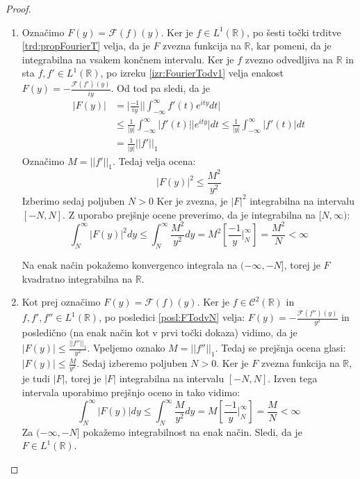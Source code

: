 \documentclass[a4paper, 10pt]{article}
\newcommand{\abs}[1]{\ensuremath{\lvert #1 \rvert}}
\newcommand{\mth}[1]{\ensuremath{\mathbb{#1}}}
\newcommand{\R}{\mth{R}}
\begin{document}
			\begin{proof}
				\begin{enumerate}
					\item Označimo $F(y) = \mathcal{F}(f)(y)$. Ker je $f\in L^1(\R)$, po šesti točki trditve \ref{trd:propFourierT} velja, da je $F$ zvezna funkcija na $\R$, kar pomeni, da je integrabilna na vsakem končnem intervalu. Ker je $f$ zvezno odvedljiva na $\R$ in sta $f, f'\in L^1(\R)$, po izreku \ref{izr:FourierTodv1} velja enakost $F(y) = -\frac{\mathcal{F}(f')(y)}{iy}$. Od tod pa sledi, da je \begin{align*}
						\abs{F(y)} &= \abs{\frac{-1}{iy}}\abs{\int_{-\infty}^{\infty}f'(t)e^{ity}dt} \\
						&\leq \frac{1}{\abs{y}}\int_{-\infty}^{\infty}\abs{f'(t)}\abs{e^{ity}}dt \leq \frac{1}{\abs{y}}\int_{-\infty}^{\infty}\abs{f'(t)}dt \\
						&= \frac{1}{\abs{y}}\abs{\abs{f'}}_1
					\end{align*} Označimo $M = \abs{\abs{f'}}_1$. Tedaj velja ocena: $$\abs{F(y)}^2 \leq \frac{M^2}{y^2} $$ 
					Izberimo sedaj poljuben $N> 0$ Ker je zvezna, je $\abs{F}^2$ integrabilna na intervalu $[-N, N]$. Z uporabo prejšnje ocene preverimo, da je integrabilna na $[N, \infty)$: $$\int_{N}^{\infty}\abs{F(y)}^2 dy \leq \int_{N}^{\infty}\frac{M^2}{y^2}dy = M^2 [\frac{-1}{y}|_{N}^{\infty}] = \frac{M^2}{N} < \infty$$
					
					Na enak način pokažemo konvergenco integrala na $(-\infty, -N]$, torej je $F$ kvadratno integrabilna na $\R$.
					\item Kot prej označimo $F(y) = \mathcal{F}(f)(y)$. Ker je $f\in\mathcal{C}^2(\R)$ in $f, f', f''\in L^1(\R)$, po posledici \ref{posl:FTodvN} velja: $F(y) = -\frac{\mathcal{F}(f'')(y)}{y^2}$ in posledično (na enak način kot v prvi točki dokaza) vidimo, da je $\abs{F(y)}\leq\frac{\abs{\abs{f''}}_1}{y^2}$. Vpeljemo oznako $M=\abs{\abs{f''}}_1$. Tedaj se prejšnja ocena glasi: $\abs{F(y)}\leq\frac{M}{y^2}$.
					Sedaj izberemo poljuben $N>0$. Ker je $F$ zvezna funkcija na $\R$, je tudi $\abs{F}$, torej je $\abs{F}$ integrabilna na intervalu $[-N, N]$. Izven tega intervala uporabimo prejšnjo oceno in tako vidimo: $$\int_{N}^{\infty}\abs{F(y)}dy \leq \int_{N}^{\infty}\frac{M}{y^2}dy = M[\frac{-1}{y}|_{N}^{\infty}] = \frac{M}{N} < \infty$$
					Za $(-\infty, -N]$ pokažemo integrabilnost na enak način. Sledi, da je $F\in L^1(\R)$.
				\end{enumerate}
			\end{proof}
			
\end{document}
